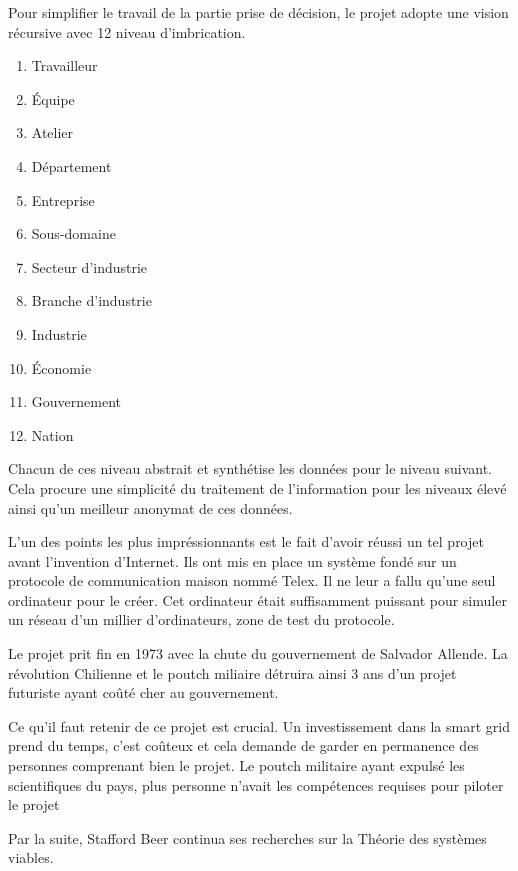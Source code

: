 Pour simplifier le travail de la partie prise de décision, le projet adopte une vision récursive avec
12 niveau d'imbrication.

\begin{enumerate}
  \item Travailleur
  \item Équipe
  \item Atelier
  \item Département
  \item Entreprise
  \item Sous-domaine
  \item Secteur d'industrie
  \item Branche d'industrie
  \item Industrie
  \item Économie
  \item Gouvernement
  \item Nation
\end{enumerate}

Chacun de ces niveau abstrait et synthétise les données pour le niveau suivant.
Cela procure une simplicité du traitement de l'information pour les niveaux élevé
ainsi qu'un meilleur anonymat de ces données.

L'un des points les plus impréssionnants est le fait d'avoir réussi un tel projet avant
l'invention d'Internet. Ils ont mis en place un système fondé sur un protocole de communication maison nommé Telex.
Il ne leur a fallu qu'une seul ordinateur pour le créer. Cet ordinateur était suffisamment puissant pour
simuler un réseau d'un millier d'ordinateurs, zone de test du protocole.

Le projet prit fin en 1973 avec la chute du gouvernement de Salvador Allende.
La révolution Chilienne et le poutch miliaire détruira ainsi 3 ans d'un projet futuriste ayant
coûté cher au gouvernement.

Ce qu'il faut retenir de ce projet est crucial. Un investissement dans la smart grid prend du temps,
c'est coûteux et cela demande de garder en permanence des personnes comprenant bien le projet.
Le poutch militaire ayant expulsé les scientifiques du pays, plus personne n'avait les compétences
requises pour piloter le projet

Par la suite, Stafford Beer continua ses recherches sur la Théorie des systèmes viables.



